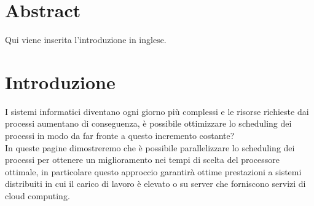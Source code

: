 \chapter{Abstract}
Qui viene inserita l'introduzione in inglese.

\chapter{Introduzione}
I sistemi informatici diventano ogni giorno più complessi e le risorse richieste dai processi aumentano di conseguenza, è possibile ottimizzare lo scheduling dei processi in modo da far fronte a questo incremento costante?\\
In queste pagine dimostreremo che è possibile parallelizzare lo scheduling dei processi per ottenere un miglioramento nei tempi di scelta del processore ottimale, in particolare questo approccio garantirà ottime prestazioni a sistemi distribuiti in cui il carico di lavoro è elevato o su server che forniscono servizi di cloud computing.